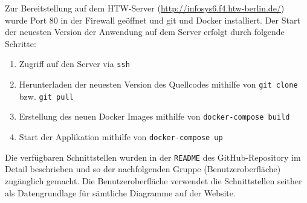 Zur Bereitstellung auf dem HTW-Server (\url{http://infosys6.f4.htw-berlin.de/}) wurde Port 80 in der Firewall geöffnet und git und Docker installiert.
Der Start der neuesten Version der Anwendung auf dem Server erfolgt durch folgende Schritte:
\begin{enumerate}
  \item Zugriff auf den Server via \lstinline|ssh|
  \item Herunterladen der neuesten Version des Quellcodes mithilfe von \lstinline|git clone| bzw. \lstinline|git pull|
  \item Erstellung des neuen Docker Images mithilfe von \lstinline|docker-compose build|
  \item Start der Applikation mithilfe von \lstinline|docker-compose up|
\end{enumerate}

Die verfügbaren Schnittstellen wurden in der \lstinline|README| des GitHub-Repository im Detail beschrieben und so der nachfolgenden Gruppe (Benutzeroberfläche) zugänglich gemacht.
Die Benutzeroberfläche verwendet die Schnittstellen seither als Datengrundlage für sämtliche Diagramme auf der Website.
